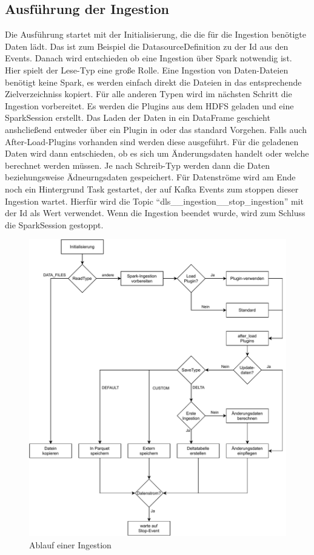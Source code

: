 \subsection{Ausführung der Ingestion}
\label{sec:ingestion-run}
Die Ausführung startet mit der Initialisierung, die die für die Ingestion benötigte Daten lädt.
Das ist zum Beispiel die DatasourceDefinition zu der Id aus den Events.
Danach wird entschieden ob eine Ingestion über Spark notwendig ist.
Hier spielt der Lese-Typ eine große Rolle.
Eine Ingestion von Daten-Dateien benötigt keine Spark, es werden einfach direkt die Dateien in das entsprechende Zielverzeichniss kopiert.
Für alle anderen Typen wird im nächsten Schritt die Ingestion vorbereitet.
Es werden die Plugins aus dem HDFS geladen und eine SparkSession erstellt.
Das Laden der Daten in ein DataFrame geschieht anshcließend entweder über ein Plugin in oder das standard Vorgehen.
Falls auch After-Load-Plugins vorhanden sind werden diese ausgeführt.
Für die geladenen Daten wird dann entschieden, ob es sich um Änderungsdaten handelt oder welche berechnet werden müssen.
Je nach Schreib-Typ werden dann die Daten beziehungsweise Ädneurngsdaten gespeichert.
Für Datenströme wird am Ende noch ein Hintergrund Task gestartet, der auf Kafka Events zum stoppen dieser Ingestion wartet.
Hierfür wird die Topic "`dls\_\_ingestion\_\_stop\_ingestion"' mit der Id als Wert verwendet.
Wenn die Ingestion beendet wurde, wird zum Schluss die SparkSession gestoppt.

\begin{figure}
    \centering
    \includegraphics[width=\textwidth]{Grafiken/Umsetzung-Ingestion-Ablauf.pdf}
    \caption{Ablauf einer Ingestion}
    \label{fig:umsetz-ingestion-ablauf}
\end{figure}